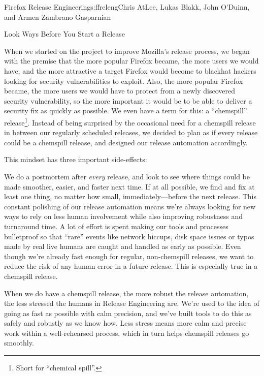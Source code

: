 \begin{aosachapter}{Firefox Release Engineering}{s:ffreleng}{Chris AtLee, Lukas Blakk, John O'Duinn, and Armen Zambrano Gasparnian}
\begin{aosasect1}{Look  Ways Before You Start a Release}

When we started on the project to improve Mozilla's release process,
we began with the premise that the more popular Firefox became, the
more users we would have, and the more attractive a target Firefox would
become to blackhat hackers looking for security vulnerabilities to
exploit. Also, the more popular Firefox became, the more users we
would have to protect from a newly discovered security vulnerability,
so the more important it would be to be able to deliver a security fix as quickly
as possible. We even have a term for this: a ``chemspill''
release\footnote{Short for ``chemical spill''.}. Instead of being surprised by the occasional need for a
chemspill release in between our regularly scheduled releases, we
decided to plan as if every release could be a chemspill release, and
designed our release automation accordingly.

This mindset has three important side-effects:

\begin{aosaenumerate}

\item We do a postmortem after \emph{every} release, and look to see
  where things could be made smoother, easier, and faster next
  time. If at all possible, we find and fix at least one thing,
  no matter how small, immediately---before the next release. This constant
  polishing of our release automation means we're always looking for
  new ways to rely on less human involvement while also improving
  robustness and turnaround time. A lot of effort is spent
  making our tools and processes bulletproof so that ``rare'' events
  like network hiccups, disk space issues or typos made by real live
  humans are caught and handled as early as possible.  Even though
  we're already fast enough for regular, non-chemspill releases, we
  want to reduce the risk of any human error in a future
  release. This is especially true in a chemspill release.

\item When we do have a chemspill release, the more robust the
  release automation, the less stressed the humans in Release
  Engineering are. We're used to the idea of going as fast as
  possible with calm precision, and we've built tools to do
  this as safely and robustly as we know how. Less stress means more
  calm and precise work within a well-rehearsed process, which in turn
  helps chemspill releases go smoothly.


\end{aosaenumerate}
\end{aosasect1}
\end{aosachapter}
